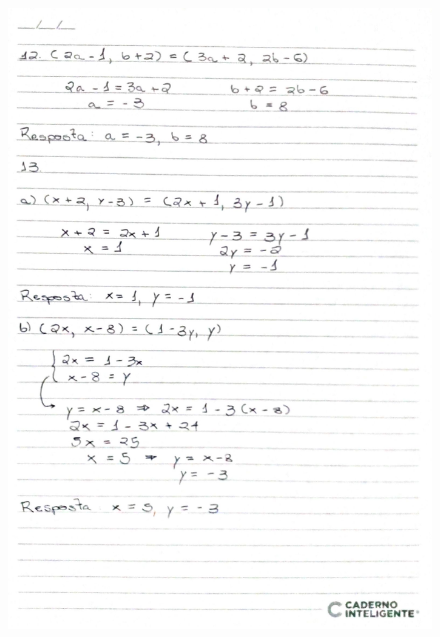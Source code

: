 \documentclass[
  12pt,     %
  openright,      %
  oneside,      %
  a4paper     %
  ]{abntex2}
\begin{document}
\begin{figure}[H]
  \centering
  \includegraphics[scale=0.23]{pagina7.jpg}
\end{figure}
\end{document}

